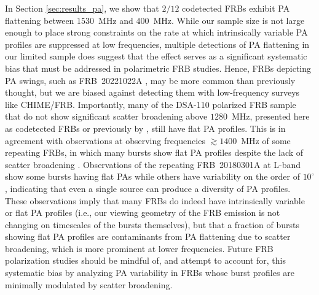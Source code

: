 \documentclass[twocolumn, linenumbers]{aastex701}
\begin{document}
In Section \ref{sec:results_pa}, we show that $2/12$ codetected FRBs exhibit PA flattening between $1530$~MHz and $400$~MHz. While our sample size is not large enough to place strong constraints on the rate at which intrinsically variable PA profiles are suppressed at low frequencies, multiple detections of PA flattening in our limited sample does suggest that the effect serves as a significant systematic bias that must be addressed in polarimetric FRB studies. Hence, FRBs depicting PA swings, such as FRB~20221022A \citep{2025Natur.637...43M}, may be more common than previously thought, but we are biased against detecting them with low-frequency surveys like CHIME/FRB. Importantly, many of the DSA-110 polarized FRB sample that do not show significant scatter broadening above $1280$~MHz, presented here as codetected FRBs or previously by \cite{2024ApJ...964..131S}, still have flat PA profiles. This is in agreement with observations at observing frequencies $\gtrsim 1400$~MHz of some repeating FRBs, in which many bursts show flat PA profiles despite the lack of scatter broadening \citep[e.g.,][]{2018Natur.553..182M, 2021NatAs...5..594N, 2021MNRAS.508.5354H, 2025ApJ...988..175L, 2026arXiv260320663W}. Observations of the repeating FRB~20180301A at L-band show some bursts having flat PAs while others have variability on the order of $10^\circ$ \citep{2020Natur.586..693L}, indicating that even a single source can produce a diversity of PA profiles. These observations imply that many FRBs do indeed have intrinsically variable or flat PA profiles (i.e., our viewing geometry of the FRB emission is not changing on timescales of the bursts themselves), but that a fraction of bursts showing flat PA profiles are contaminants from PA flattening due to scatter broadening, which is more prominent at lower frequencies. Future FRB polarization studies should be mindful of, and attempt to account for, this systematic bias by analyzing PA variability in FRBs whose burst profiles are minimally modulated by scatter broadening.
\end{document}
